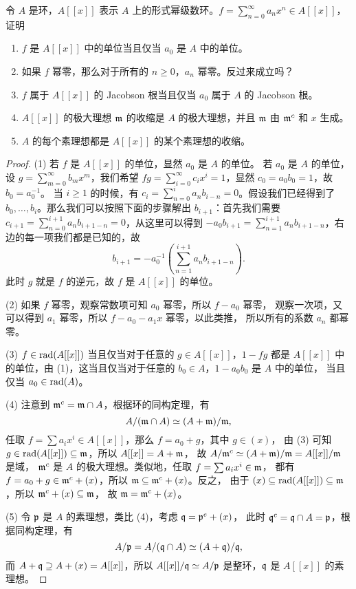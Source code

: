 \begin{problem}
  令 $A$ 是环，$A[[x]]$ 表示 $A$ 上的形式幂级数环。$f=\sum_{n=0}^\infty a_nx^n\in A[[x]]$，证明
  \begin{enumerate}
    \item $f$ 是 $A[[x]]$ 中的单位当且仅当 $a_0$ 是 $A$ 中的单位。
    \item 如果 $f$ 幂零，那么对于所有的 $n\geq 0$，$a_n$ 幂零。反过来成立吗？
    \item $f$ 属于 $A[[x]]$ 的 Jacobson 根当且仅当 $a_0$ 属于 $A$ 的 Jacobson 根。
    \item $A[[x]]$ 的极大理想 $\mathfrak{m}$ 的收缩是 $A$ 的极大理想，并且 $\mathfrak{m}$
    由 $\mathfrak{m}^c$ 和 $x$ 生成。
    \item $A$ 的每个素理想都是 $A[[x]]$ 的某个素理想的收缩。
  \end{enumerate}
\end{problem}
\begin{proof}
  (1) 若 $f$ 是 $A[[x]]$ 的单位，显然 $a_0$ 是 $A$ 的单位。
  若 $a_0$ 是 $A$ 的单位，设 $g=\sum_{m=0}^\infty b_mx^m$，我们希望
  $fg=\sum_{i=0}^\infty c_ix^i=1$，显然 $c_0=a_0b_0=1$，故 $b_0=a_0^{-1}$。
  当 $i\geq 1$ 的时候，有 $c_i=\sum_{n=0}^i a_nb_{i-n}=0$。假设我们已经得到了
  $b_0,\dots,b_i$。那么我们可以按照下面的步骤解出 $b_{i+1}$：首先我们需要
  $c_{i+1}=\sum_{n=0}^{i+1} a_nb_{i+1-n}=0$，从这里可以得到
  $-a_0b_{i+1}=\sum_{n=1}^{i+1} a_nb_{i+1-n}$，右边的每一项我们都是已知的，故
  \[
    b_{i+1}=-a_0^{-1}\left(\sum_{n=1}^{i+1} a_nb_{i+1-n}\right)  .
  \]
  此时 $g$ 就是 $f$ 的逆元，故 $f$ 是 $A[[x]]$ 的单位。

  (2) 如果 $f$ 幂零，观察常数项可知 $a_0$ 幂零，所以 $f-a_0$ 幂零，
  观察一次项，又可以得到 $a_1$ 幂零，所以 $f-a_0-a_1x$ 幂零，以此类推，
  所以所有的系数 $a_n$ 都幂零。

  (3) $f\in \operatorname{rad}(A[[x]])$ 当且仅当对于任意的 $g\in A[[x]]$，$1-fg$ 都是 $A[[x]]$
  中的单位，由 (1)，这当且仅当对于任意的 $b_0\in A$，$1-a_0b_0$ 是 $A$ 中的单位，
  当且仅当 $a_0\in \operatorname{rad}(A)$。

  (4) 注意到 $\mathfrak{m}^c=\mathfrak{m}\cap A$，根据环的同构定理，有
  \[
    A/(\mathfrak{m}\cap A)\simeq (A+\mathfrak{m})/\mathfrak{m},  
  \]
  任取 $f=\sum a_ix^i\in A[[x]]$，那么 $f=a_0+g$，其中 $g\in (x)$，
  由 (3) 可知 $g\in \operatorname{rad}(A[[x]])\subseteq\mathfrak{m}$，所以 $A[[x]]=A+\mathfrak{m}$，
  故 $A/\mathfrak{m}^c\simeq (A+\mathfrak{m})/\mathfrak{m}=A[[x]]/\mathfrak{m}$ 是域，
  $\mathfrak{m}^c$ 是 $A$ 的极大理想。类似地，任取 $f=\sum a_ix^i\in \mathfrak{m}$，
  都有 $f=a_0+g\in \mathfrak{m}^c+(x)$，所以 $\mathfrak{m}\subseteq \mathfrak{m}^c+(x)$。反之，
  由于 $(x)\subseteq\operatorname{rad}(A[[x]])\subseteq \mathfrak{m}$，所以 $\mathfrak{m}^c+(x)\subseteq\mathfrak{m}$，
  故 $\mathfrak{m}=\mathfrak{m}^c+(x)$。

  (5) 令 $\mathfrak{p}$ 是 $A$ 的素理想，类比 (4)，考虑 $\mathfrak{q}=\mathfrak{p}^e+(x)$，
  此时 $\mathfrak{q}^c=\mathfrak{q}\cap A=\mathfrak{p}$，根据同构定理，有
  \[
    A/\mathfrak{p}=A/(\mathfrak{q}\cap A)\simeq (A+\mathfrak{q})/\mathfrak{q},  
  \]
  而 $A+\mathfrak{q}\supseteq A+(x)=A[[x]]$，所以 $A[[x]]/\mathfrak{q}\simeq A/\mathfrak{p}$
  是整环，$\mathfrak{q}$ 是 $A[[x]]$ 的素理想。
\end{proof}

